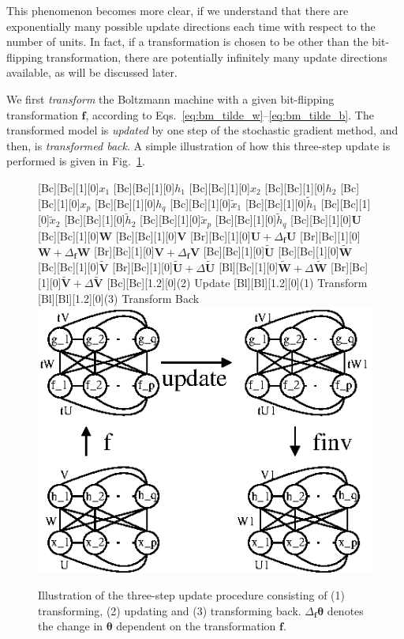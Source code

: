 \documentclass{now}
\newcommand{\vect}[1]{\mathbf{#1}}
\newcommand{\vects}[1]{\boldsymbol{#1}}
\newcommand{\matr}[1]{\mathbf{#1}}
\newcommand{\vf}[0]{\vect{f}}
\newcommand{\mW}[0]{\matr{W}}
\newcommand{\mU}[0]{\matr{U}}
\newcommand{\mV}[0]{\matr{V}}
\newcommand{\TT}[0]{{\vects{\theta}}}
\begin{document}
This phenomenon becomes more clear, if we understand that
there are exponentially many possible update directions each
time with respect to the number of units. In fact, if a
transformation is chosen to be other than the bit-flipping
transformation, there are potentially infinitely many update
directions available, as will be discussed later.

We first
\textit{transform} the Boltzmann machine with a given
bit-flipping transformation $\vf$, according to
Eqs.~\eqref{eq:bm_tilde_w}--\eqref{eq:bm_tilde_b}. The
transformed model is \textit{updated} by one step of the
stochastic gradient method, and then, is \textit{transformed
back}. A simple illustration of how this three-step update
is performed is given in
Fig.~\ref{fig:bm_three_step_update}.

\begin{figure}[t]
    \centering
    [Bc][Bc][1][0]{$x_1$}
    [Bc][Bc][1][0]{$h_1$}
    [Bc][Bc][1][0]{$x_2$}
    [Bc][Bc][1][0]{$h_2$}
    [Bc][Bc][1][0]{$x_p$}
    [Bc][Bc][1][0]{$h_q$}
    [Bc][Bc][1][0]{$\tilde{x}_1$}
    [Bc][Bc][1][0]{$\tilde{h}_1$}
    [Bc][Bc][1][0]{$\tilde{x}_2$}
    [Bc][Bc][1][0]{$\tilde{h}_2$}
    [Bc][Bc][1][0]{$\tilde{x}_p$}
    [Bc][Bc][1][0]{$\tilde{h}_q$}
    [Bc][Bc][1][0]{$\mU$}
    [Bc][Bc][1][0]{$\mW$}
    [Bc][Bc][1][0]{$\mV$}
    [Br][Bc][1][0]{$\mU+\Delta_\vf \mU$}
    [Br][Bc][1][0]{$\mW+\Delta_\vf \mW$}
    [Br][Bc][1][0]{$\mV+\Delta_\vf \mV$}
    [Bc][Bc][1][0]{$\tilde{\mU}$}
    [Bc][Bc][1][0]{$\tilde{\mW}$}
    [Bc][Bc][1][0]{$\tilde{\mV}$}
    [Br][Bc][1][0]{$\tilde{\mU}+\Delta\tilde{\mU}$}
    [Bl][Bc][1][0]{$\tilde{\mW}+\Delta\tilde{\mW}$}
    [Br][Bc][1][0]{$\tilde{\mV}+\Delta\tilde{\mV}$}
    [Bc][Bc][1.2][0]{(2) Update}
    [Bl][Bl][1.2][0]{(1) Transform}
    [Bl][Bl][1.2][0]{(3) Transform Back}
    \includegraphics[width=0.8\columnwidth]{../figures/fbm_3step.eps}
    \caption{Illustration of the three-step update procedure
    consisting of (1) transforming, (2) updating and (3)
    transforming back. $\Delta_\vf \TT$ denotes the change
    in $\TT$ dependent on the transformation $\vf$.}
    \label{fig:bm_three_step_update}
\end{figure}
\end{document}
